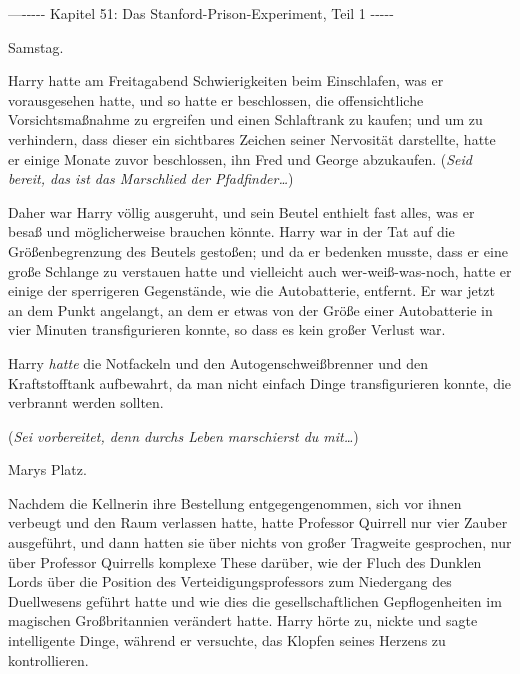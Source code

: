 

\hypertarget{das-stanford-prison-experiment-teil-1}{%

—\/-\/-\/-\/-\/- Kapitel 51: Das Stanford-Prison-Experiment, Teil 1 -\/-\/-\/-\/-

Samstag.

Harry hatte am Freitagabend Schwierigkeiten beim Einschlafen, was er vorausgesehen hatte, und so hatte er beschlossen, die offensichtliche Vorsichtsmaßnahme zu ergreifen und einen Schlaftrank zu kaufen; und um zu verhindern, dass dieser ein sichtbares Zeichen seiner Nervosität darstellte, hatte er einige Monate zuvor beschlossen, ihn Fred und George abzukaufen. (\emph{Seid bereit, das ist das Marschlied der Pfadfinder…})

Daher war Harry völlig ausgeruht, und sein Beutel enthielt fast alles, was er besaß und möglicherweise brauchen könnte. Harry war in der Tat auf die Größenbegrenzung des Beutels gestoßen; und da er bedenken musste, dass er eine große Schlange zu verstauen hatte und vielleicht auch wer-weiß-was-noch, hatte er einige der sperrigeren Gegenstände, wie die Autobatterie, entfernt. Er war jetzt an dem Punkt angelangt, an dem er etwas von der Größe einer Autobatterie in vier Minuten transfigurieren konnte, so dass es kein großer Verlust war.

Harry \emph{hatte} die Notfackeln und den Autogenschweißbrenner und den Kraftstofftank aufbewahrt, da man nicht einfach Dinge transfigurieren konnte, die verbrannt werden sollten.

(\emph{Sei vorbereitet, denn durchs Leben marschierst du mit…})

Marys Platz.

Nachdem die Kellnerin ihre Bestellung entgegengenommen, sich vor ihnen verbeugt und den Raum verlassen hatte, hatte Professor Quirrell nur vier Zauber ausgeführt, und dann hatten sie über nichts von großer Tragweite gesprochen, nur über Professor Quirrells komplexe These darüber, wie der Fluch des Dunklen Lords über die Position des Verteidigungsprofessors zum Niedergang des Duellwesens geführt hatte und wie dies die gesellschaftlichen Gepflogenheiten im magischen Großbritannien verändert hatte. Harry hörte zu, nickte und sagte intelligente Dinge, während er versuchte, das Klopfen seines Herzens zu kontrollieren.

}
